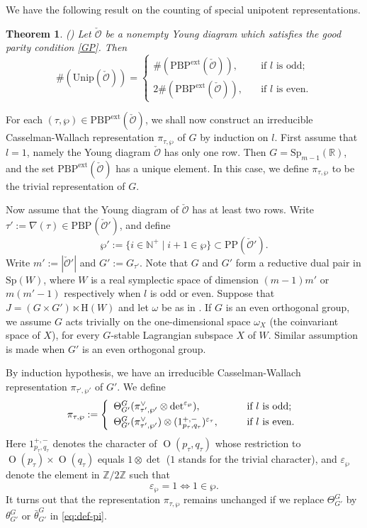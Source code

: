 \documentclass[lang = american]{ems-icm} %
\newcommand{\Z}{\mathbb{Z}}
\newcommand{\R}{\mathbb R}
\def\Sp{{\mathrm{Sp}}}
\newcommand{\oO}{\operatorname{O}}
\newcommand{\CO}{{\mathcal {O}}}
\numberwithin{equation}{section}
\newtheorem{thm}{Theorem}[section]
\theoremstyle{remark}
\begin{document}
We have the following result on the counting of special unipotent representations.

\begin{thm}\label{thmcount}\emph{(\cites{BMSZ2, BMSZ3})}
Let $\check \CO$ be a nonempty Young diagram which satisfies the good parity condition \cref{GP}. Then
\[
 \#(\mathrm{Unip}(\check \CO))= \begin{cases}
\#(\mathrm{PBP}^{\mathrm{ext}}(\check \CO)),  &\quad  \textrm{if $l$ is odd};\\
2  \#(\mathrm{PBP}^{\mathrm{ext}}(\check \CO)),&\quad  \textrm{if $l$ is even}.
\end{cases}
\]
\end{thm}

For each $(\tau, \wp)\in  \mathrm{PBP}^{\mathrm{ext}}(\check \CO)$, we shall now construct an irreducible Casselman-Wallach representation $\pi_{\tau,\wp}$ of $G$ by induction on $l$. First assume that $l=1$, namely the Young diagram $\check \CO$ has only one row. Then $G=\Sp_{m-1}(\R)$, and the set $\mathrm{PBP}^{\mathrm{ext}}(\check \CO)$ has a unique element. In this case, we define $\pi_{\tau,\wp}$ to be the trivial representation of $G$.

Now assume that the Young diagram of $\check \CO$ has at least two rows. Write $\tau':=\nabla(\tau)\in \mathrm{PBP}^{}(\check \CO')$, and define
\[
  \wp':=\{i\in \mathbb N^+\mid i+1\in \wp\}\subset \mathrm{PP}(\check \CO').
\]
Write $m':=|\check \CO'|$ and $G':=G_{\tau'}$. Note that $G$ and $G'$ form a reductive dual pair in $\Sp(W)$, where $W$ is a real symplectic space of dimension $(m-1) m'$ or $m(m'-1)$ respectively when $l$ is odd or even.  Suppose that $J=(G\times G')\ltimes \mathrm H(W)$ and let $\omega$ be as in . If $G$ is an even orthogonal group, we assume $G$ acts trivially on the one-dimensional space $\omega_{X}$ (the coinvariant space of $X$), for every $G$-stable Lagrangian subspace $X$ of $W$. Similar assumption is made when $G'$ is an even orthogonal group.

By induction hypothesis, we have an irreducible Casselman-Wallach representation $\pi_{\tau',\wp'}$ of $G'$.   We define
\begin{equation}\label{eq:def-pi}
    \pi_{\tau,\wp}:=\left\{
     \begin{array}{ll}
  \Theta_{G'}^{G}(\pi_{\tau',\wp'}^\vee \otimes \det^{\varepsilon_{\wp}}),\quad  &\quad \hbox{if $l$ is odd};  \smallskip\\
          \Theta_{G'}^{G}(\pi_{\tau',\wp'}^\vee)\otimes (1_{p_\tau, q_\tau}^{+,-})^{\varepsilon_{\tau}}, \quad & \quad \hbox{if  $l$ is even}.
            \end{array}
   \right.
 \end{equation}
 Here $1_{p_\tau, q_\tau}^{+,-}$ denotes the character of $\oO(p_\tau, q_\tau)$ whose restriction to $\oO(p_\tau)\times \oO(q_\tau)$ equals $1\otimes \det$ ($1$ stands for the trivial character), and
$\varepsilon_{\wp}$ denote the element in $\Z/2\Z$ such that  \[
 \varepsilon_{\wp}=1\Leftrightarrow  1\in \wp.
\]
It turns out that the representation $\pi_{\tau, \wp}$ remains unchanged if we replace $\Theta_{G'}^{G}$ by $\theta_{G'}^{G}$ or $\bar \theta_{G'}^{G}$ in \eqref{eq:def-pi}.
\end{document}
